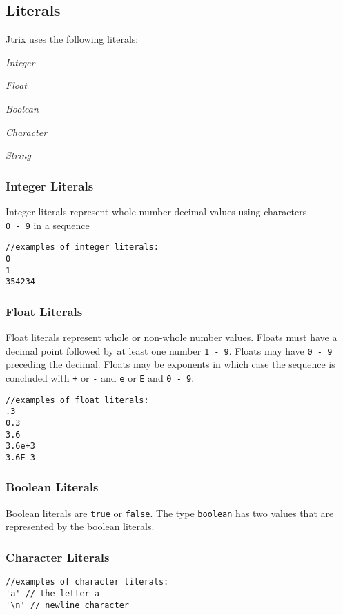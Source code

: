 \documentclass[12pt]{report}
\begin{document}
\subsection{Literals}
Jtrix uses the following literals:

 \textit{Integer}

 \textit{Float}

 \textit{Boolean}

 \textit{Character}

 \textit{String}

\subsubsection{Integer Literals}
Integer literals represent whole number decimal values using characters \\ \texttt{0 - 9} in a sequence
\begin{lstlisting}
//examples of integer literals:
0
1
354234
\end{lstlisting}

\subsubsection{Float Literals}
Float literals represent whole or non-whole number values. Floats must have a decimal point followed by at least one number \texttt{1 - 9}. Floats may have \texttt{0 - 9} preceding the decimal. Floats may be exponents in which case the sequence is concluded with \texttt{+} or \texttt{-} and \texttt{e} or \texttt{E}  and \texttt{0 - 9}.
\begin{lstlisting}
//examples of float literals:
.3
0.3
3.6
3.6e+3
3.6E-3
\end{lstlisting}

\subsubsection{Boolean Literals}
Boolean literals are \texttt{true} or \texttt{false}. The type \texttt{boolean} has two values that are represented by the boolean literals.

\subsubsection{Character Literals}
\begin{lstlisting}
//examples of character literals:
'a' // the letter a
'\n' // newline character
\end{lstlisting}
\end{document}
